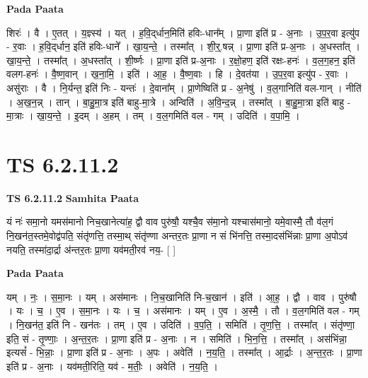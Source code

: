 \documentclass[17pt]{extarticle}
\begin{document}
\textbf{Pada Paata} \newline

शिरः॑ । वै । ए॒तत् । य॒ज्ञ्स्य॑ । यत् । ह॒वि॒द्‌र्धान॒मिति॑ हविः-धान᳚म् । प्रा॒णा इति॑ प्र - अ॒नाः । उ॒प॒र॒वा इत्यु॑प - र॒वाः । ह॒वि॒द्‌र्धान॒ इति॑ हविः-धाने᳚ । खा॒य॒न्ते॒ । तस्मा᳚त् । शी॒र्॒.षन्न् । प्रा॒णा इति॑ प्र-अ॒नाः । अ॒धस्ता᳚त् । खा॒य॒न्ते॒ । तस्मा᳚त् । अ॒धस्ता᳚त् । शी॒र्ष्णः । प्रा॒णा इति॑ प्र-अ॒नाः । र॒क्षो॒हण॒ इति॑ रक्षः-हनः॑ । व॒ल॒ग॒हन॒ इति॑ वलग-हनः॑ । वै॒ष्ण॒वान् । ख॒ना॒मि॒ । इति॑ । आ॒ह॒ । वै॒ष्ण॒वाः । हि । दे॒वत॑या । उ॒प॒र॒वा इत्यु॑प - र॒वाः । असु॑राः । वै । नि॒र्यन्त॒ इति॑ निः - यन्तः॑ । दे॒वाना᳚म् । प्रा॒णेष्विति॑ प्र - अ॒नेषु॑ । व॒ल॒गानिति॑ वल-गान् । नीति॑ । अ॒ख॒न॒न्न् । तान् । बा॒हु॒मा॒त्र इति॑ बाहु-मा॒त्रे । अन्विति॑ । अ॒वि॒न्द॒न्न् । तस्मा᳚त् । बा॒हु॒मा॒त्रा इति॑ बाहु - मा॒त्राः । खा॒य॒न्ते॒ । इ॒दम् । अ॒हम् । तम् । व॒ल॒गमिति॑ वल - गम् । उदिति॑ । व॒पा॒मि॒ ।  \newline




\section*{ TS 6.2.11.2 }

\textbf{TS 6.2.11.2 } \newline
\textbf{Samhita Paata} \newline

यं नः॑ समा॒नो यमस॑मानो निच॒खानेत्या॑ह॒ द्वौ वाव पुरु॑षौ॒ यश्चै॒व स॑मा॒नो यश्चास॑मानो॒ यमे॒वास्मै॒ तौ व॑ल॒गं नि॒खन॑त॒स्तमे॒वोद्व॑पति॒ संतृ॑णत्ति॒ तस्मा॒थ् संतृ॑ण्णा अन्तर॒तः प्रा॒णा न सं भि॑नत्ति॒ तस्मा॒दस॑भिंन्नाः प्रा॒णा अ॒पोऽव॑ नयति॒ तस्मा॑दा॒र्द्रा अ॑न्तर॒तः प्रा॒णा यव॑मती॒रव॑ नय॒- [  ] \newline

\textbf{Pada Paata} \newline

यम् । नः॒ । स॒मा॒नः । यम् । अस॑मानः । नि॒च॒खानिति॑ नि-च॒खान॑ । इति॑ । आ॒ह॒ । द्वौ । वाव । पुरु॑षौ । यः । च॒ । ए॒व । स॒मा॒नः । यः । च॒ । अस॑मानः । यम् । ए॒व । अ॒स्मै॒ । तौ । व॒ल॒गमिति॑ वल - गम् । नि॒खन॑त॒ इति॑ नि - खन॑तः । तम् । ए॒व । उदिति॑ । व॒प॒ति॒ । समिति॑ । तृ॒ण॒त्ति॒ । तस्मा᳚त् । संतृ॑ण्णा॒ इति॒ सं - तृ॒ण्णाः॒ । अ॒न्त॒र॒तः । प्रा॒णा इति॑ प्र - अ॒नाः । न । समिति॑ । भि॒न॒त्ति॒ । तस्मा᳚त् । अस॑भिंन्ना॒ इत्यसं᳚ - भि॒न्नाः॒ । प्रा॒णा इति॑ प्र - अ॒नाः । अ॒पः । अवेति॑ । न॒य॒ति॒ । तस्मा᳚त् । आ॒र्द्राः । अ॒न्त॒र॒तः । प्रा॒णा इति॑ प्र - अ॒नाः । यव॑मती॒रिति॒ यव॑ - म॒तीः॒ । अवेति॑ । न॒य॒ति॒ ।  \newline
\end{document}
